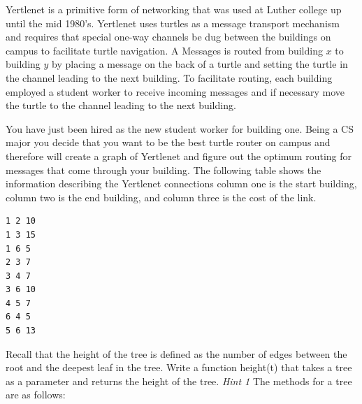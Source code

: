\documentclass[11pt]{exam}
\begin{document}
\begin{questions}
\newpage
\question
Yertlenet is a primitive form of networking that was used at Luther college up until the mid 1980's.  Yertlenet uses turtles as a message transport mechanism and requires that special one-way channels be dug between the buildings on campus to facilitate turtle navigation. A Messages is routed from building $x$ to building $y$ by placing a message on the back of a turtle and setting the turtle in the channel leading to the next building.  To facilitate routing, each building employed a student worker to receive incoming messages and if necessary move the turtle to the channel leading to the next building.  

You have just been hired as the new student worker for building one. Being a CS major you decide that you want to be the best turtle router on campus and therefore will create a graph of Yertlenet and figure out the optimum routing for messages that come through your building. The following table shows the information describing the Yertlenet connections column one is the start building, column two is the end building, and column three is the cost of the link.

\begin{verbatim}
1 2 10
1 3 15
1 6 5
2 3 7
3 4 7
3 6 10
4 5 7
6 4 5
5 6 13
\end{verbatim}


\newpage
\question[10]  Recall that the height of the tree is defined as the number of edges between the root and the deepest leaf in the tree.  Write a function height(t) that takes a tree as a parameter and returns the height of the tree.  \textit{Hint 1} The methods for a tree are as follows:
\begin{itemize}


\end{itemize}
\end{questions}
\end{document}
